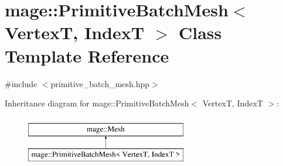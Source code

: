 \hypertarget{classmage_1_1_primitive_batch_mesh}{}\section{mage\+:\+:Primitive\+Batch\+Mesh$<$ VertexT, IndexT $>$ Class Template Reference}
\label{classmage_1_1_primitive_batch_mesh}


{\ttfamily \#include $<$primitive\+\_\+batch\+\_\+mesh.\+hpp$>$}

Inheritance diagram for mage\+:\+:Primitive\+Batch\+Mesh$<$ VertexT, IndexT $>$\+:\begin{figure}[H]
\begin{center}
\leavevmode
\includegraphics[height=2.000000cm]{classmage_1_1_primitive_batch_mesh}
\end{center}
\end{figure}
